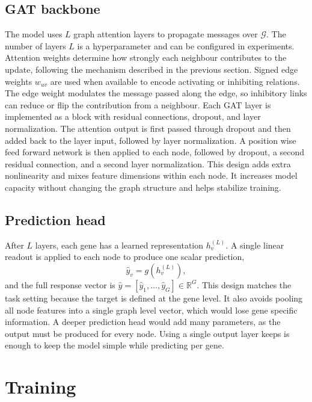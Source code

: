 \subsection{GAT backbone}
The model uses $L$ graph attention layers to propagate messages over $\mathcal{G}$. The number of layers $L$ is a hyperparameter and can be configured in experiments. Attention weights determine how strongly each neighbour contributes to the update, following the mechanism described in the previous section. Signed edge weights $w_{uv}$ are used when available to encode activating or inhibiting relations. The edge weight modulates the message passed along the edge, so inhibitory links can reduce or flip the contribution from a neighbour.
Each GAT layer is implemented as a block with residual connections, dropout, and layer normalization. The attention output is first passed through dropout and then added back to the layer input, followed by layer normalization. A position wise feed forward network is then applied to each node, followed by dropout, a second residual connection, and a second layer normalization. This design adds extra nonlinearity and mixes feature dimensions within each node. It increases model capacity without changing the graph structure and helps stabilize training.

\subsection{Prediction head}
After $L$ layers, each gene has a learned representation $h_{v}^{(L)}$. A single linear readout is applied to each node to produce one scalar prediction,
\begin{equation}
\hat{y}_{v} = g\!\left(h_{v}^{(L)}\right),
\end{equation}
and the full response vector is $\hat{y}=[\hat{y}_{1},\ldots,\hat{y}_{G}] \in \mathbb{R}^{G}$.
This design matches the task setting because the target is defined at the gene level. It also avoids pooling all node features into a single graph level vector, which would lose gene specific information. A deeper prediction head would add many parameters, as the output must be produced for every node. Using a single output layer keeps is enough to keep the model simple while predicting per gene.

\section{Training}
